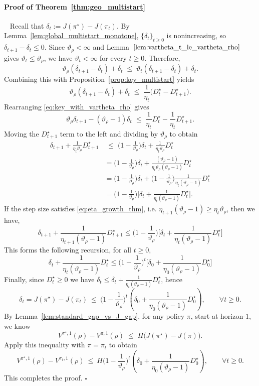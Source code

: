 \documentclass[11pt]{article}
\begin{document}
\paragraph{Proof of Theorem~\ref{thm:geo_multistart}}~\newline
Recall that $\delta_t := J(\pi^\star)-J(\pi_t)$. By Lemma~\ref{lem:global_multistart_monotone}, $\{\delta_t\}_{t\ge 0}$ is nonincreasing, so $\delta_{t+1}-\delta_t\le 0$. Since $\vartheta_\rho<\infty$ and Lemma~$\ref{lem:vartheta_t_le_vartheta_rho}$ gives $\vartheta_t\le\vartheta_\rho$, we have $\vartheta_t<\infty$ for every $t\ge0$. Therefore,
\[
\vartheta_\rho(\delta_{t+1}-\delta_t)+\delta_t
\;\le\;
\vartheta_t(\delta_{t+1}-\delta_t)+\delta_t.
\]
Combining this with Proposition~\ref{prop:key_multistart} yields
\begin{equation}
\label{eq:key_with_vartheta_rho}
\vartheta_\rho(\delta_{t+1}-\delta_t)+\delta_t
\;\le\;
\frac{1}{\eta_t}\big(D_t^\star-D_{t+1}^\star\big).
\end{equation}
Rearranging  \eqref{eq:key_with_vartheta_rho} gives
\[
\vartheta_\rho\delta_{t+1}-(\vartheta_\rho-1)\delta_t
\;\le\;
\frac{1}{\eta_t}D_t^\star-\frac{1}{\eta_t}D_{t+1}^\star.
\]
Moving the $D_{t+1}^\star$ term to the left and dividing by $\vartheta_\rho$ to obtain
\begin{align*}
\delta_{t+1}+\frac{1}{\eta_t\vartheta_\rho}D_{t+1}^\star
& \;\le\;
\Big(1-\frac{1}{\vartheta_\rho}\Big)\delta_t+\frac{1}{\eta_t\vartheta_\rho}D_t^\star \\
& = \Big(1-\frac{1}{\vartheta_\rho}\Big)\delta_t+ \frac{(\vartheta_\rho-1)}{\eta_t\vartheta_\rho(\vartheta_\rho-1)}D_t^\star \\
& = \Big(1-\frac{1}{\vartheta_\rho}\Big)\delta_t+ \Big(1-\frac{1}{\vartheta_\rho}\Big) \frac{1}{\eta_t (\vartheta_\rho-1)}D_t^\star \\
& = \Big(1-\frac{1}{\vartheta_\rho}\Big) \Big[\delta_t+\frac{1}{\eta_t (\vartheta_\rho-1)}D_t^\star \Big].
\end{align*}
If the step size satisfies \eqref{eq:eta_growth_thm}, i.e. $\eta_{t+1}(\vartheta_\rho-1) \geq \eta_t\vartheta_\rho$, then we have,
\[\delta_{t+1}+\frac{1}{\eta_{t+1}(\vartheta_\rho-1)}D_{t+1}^\star \leq \Big(1-\frac{1}{\vartheta_\rho}\Big) \Big[\delta_t+\frac{1}{\eta_t (\vartheta_\rho-1)}D_t^\star \Big] \]
This forms the following recursion, for all $t \geq 0$,
\[\delta_{t}+\frac{1}{\eta_{t}(\vartheta_\rho-1)}D_{t}^\star \leq \Big(1-\frac{1}{\vartheta_\rho}\Big)^t \Big[\delta_0+\frac{1}{\eta_0 (\vartheta_\rho-1)}D_0^\star \Big] \]
Finally, since $D_t^\star\ge 0$ we have $\delta_t \le \delta_t+\frac{1}{\eta_t(\vartheta_\rho-1)}D_t^\star$, hence
\[\delta_t = J(\pi^\star)-J(\pi_t)
\ \le\
\Big(1-\frac{1}{\vartheta_\rho}\Big)^t
\left(
\delta_0+\frac{1}{\eta_0(\vartheta_\rho-1)}D_0^\star
\right),
\qquad \forall t\ge 0.\]
By Lemma~\ref{lem:standard_gap_vs_J_gap}, for any policy $\pi$, start at horizon-$1$, we know
\[
V^{\pi^\star,1}(\rho)-V^{\pi,1}(\rho)
\;\le\;
H\big(J(\pi^\star)-J(\pi)\big).
\]
Apply this inequality with $\pi=\pi_t$ to obtain
\[V^{\pi^\star,1}(\rho)-V^{\pi_t,1}(\rho)
\ \le\
H\Big(1-\frac{1}{\vartheta_\rho}\Big)^t
\left(
\delta_0+\frac{1}{\eta_0(\vartheta_\rho-1)}D_0^\star
\right),
\qquad \forall t\ge 0.\]
This completes the proof.
\hfill
$\square$
\end{document}
